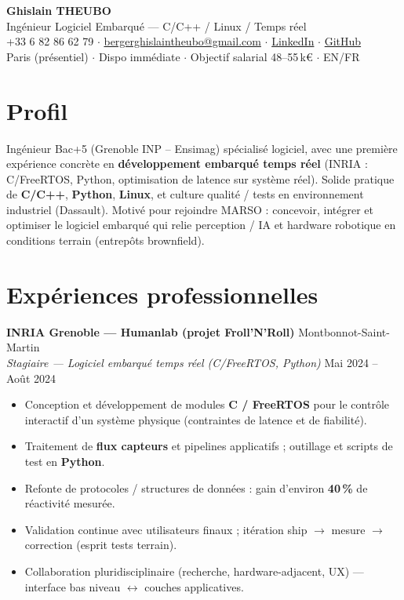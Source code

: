 \documentclass[10pt,a4paper]{article}
\begin{document}
\begin{center}
{\LARGE\bfseries Ghislain THEUBO}\\[2pt]
{\large Ing\'enieur Logiciel Embarqu\'e --- C/C++ / Linux / Temps r\'eel}\\[3pt]
+33 6 82 86 62 79 $\cdot$
\href{mailto:bergerghislaintheubo@gmail.com}{bergerghislaintheubo@gmail.com} $\cdot$
\href{https://www.linkedin.com/in/berger-ghislain}{LinkedIn} $\cdot$
\href{https://github.com/Bergerghislain}{GitHub}\\[1pt]
Paris (pr\'esentiel) $\cdot$ Dispo imm\'ediate $\cdot$ Objectif salarial 48--55\,k€ $\cdot$ EN/FR
\end{center}

\section{Profil}
Ing\'enieur Bac+5 (Grenoble INP -- Ensimag) sp\'ecialis\'e logiciel, avec une premi\`ere exp\'erience concr\`ete en \textbf{d\'eveloppement embarqu\'e temps r\'eel} (INRIA : C/FreeRTOS, Python, optimisation de latence sur syst\`eme r\'eel). Solide pratique de \textbf{C/C++}, \textbf{Python}, \textbf{Linux}, et culture qualit\'e / tests en environnement industriel (Dassault). Motiv\'e pour rejoindre MARSO : concevoir, int\'egrer et optimiser le logiciel embarqu\'e qui relie perception / IA et hardware robotique en conditions terrain (entrep\^ots brownfield).

\section{Exp\'eriences professionnelles}
\textbf{INRIA Grenoble --- Humanlab (projet Froll'N'Roll)} \hfill Montbonnot-Saint-Martin\\
\textit{Stagiaire --- Logiciel embarqu\'e temps r\'eel (C/FreeRTOS, Python)} \hfill Mai 2024 -- Ao\^ut 2024
\begin{itemize}
  \item Conception et d\'eveloppement de modules \textbf{C / FreeRTOS} pour le contr\^ole interactif d'un syst\`eme physique (contraintes de latence et de fiabilit\'e).
  \item Traitement de \textbf{flux capteurs} et pipelines applicatifs ; outillage et scripts de test en \textbf{Python}.
  \item Refonte de protocoles / structures de donn\'ees : gain d'environ \textbf{40\,\%} de r\'eactivit\'e mesur\'ee.
  \item Validation continue avec utilisateurs finaux ; it\'eration ship $\rightarrow$ mesure $\rightarrow$ correction (esprit tests terrain).
  \item Collaboration pluridisciplinaire (recherche, hardware-adjacent, UX) --- interface bas niveau $\leftrightarrow$ couches applicatives.
\end{itemize}
\end{document}
